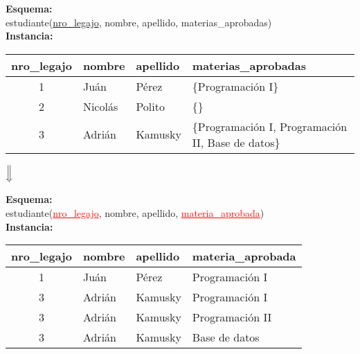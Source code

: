 \documentclass[preview]{standalone}
\begin{document}
\textbf{Esquema:}\\
estudiante(\underline{nro\_legajo}, nombre, apellido, materias\_aprobadas)\\

\textbf{Instancia:}
\begin{center}
\begin{tabular}{| c | l | l | l |}\hline			
	nro\_legajo & nombre & apellido & materias\_aprobadas \\\hline			
	1 & Ju\'an & P\'erez & \{\scriptsize{Programaci\'on I}\}\\
	2 & Nicol\'as & Polito & \{\}\\
	3 & Adri\'an & Kamusky & \{\scriptsize{Programaci\'on I, Programaci\'on II, Base de datos}\}\\\hline
\end{tabular}
\end{center}


\begin{center}
$\Big\Downarrow$
\end{center}
\textbf{Esquema:}\\
estudiante(\textcolor{red}{\underline{nro\_legajo}}, nombre, apellido, \textcolor{red}{\underline{materia\_aprobada}})\\

\textbf{Instancia:}
\begin{center}
\begin{tabular}{| c | l | l | l |}\hline			
	nro\_legajo & nombre & apellido & materia\_aprobada \\\hline			
	1 & Ju\'an & P\'erez & Programaci\'on I\\
	3 & Adri\'an & Kamusky & Programaci\'on I\\
	3 & Adri\'an & Kamusky & Programaci\'on II\\
	3 & Adri\'an & Kamusky & Base de datos\\\hline
\end{tabular}
\end{center}
\end{document}
